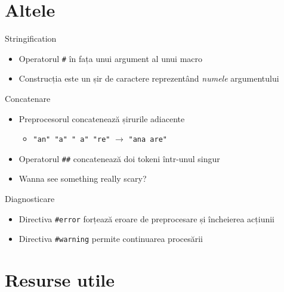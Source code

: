 \documentclass{beamer}
\begin{document}
\section{Altele}

\frame{\tableofcontents[currentsection]}

\begin{frame}{Stringification}
	\begin{itemize}
		\item Operatorul \texttt{\#} în fața unui argument al unui macro
		\item Construcția este un șir de caractere reprezentând \textit{numele} argumentului
	\end{itemize}

	
\end{frame}

\begin{frame}{Concatenare}
	\begin{itemize}
		\item Preprocesorul concatenează șirurile adiacente
			\begin{itemize}
				\item \texttt{"an" "a" " a" "re"} $\rightarrow$
\texttt{"ana are"}
			\end{itemize}
		\item Operatorul \texttt{\#\#} concatenează doi tokeni într-unul
singur
		\item Wanna see something really scary?
	\end{itemize}

	
\end{frame}

\begin{frame}{Diagnosticare}
	\begin{itemize}
		\item Directiva \texttt{\#error} forțează eroare de preprocesare și
încheierea acțiunii
		\item Directiva \texttt{\#warning} permite continuarea procesării
	\end{itemize}

	
\end{frame}

\section{Resurse utile}

\frame{\tableofcontents[currentsection]}
\end{document}
